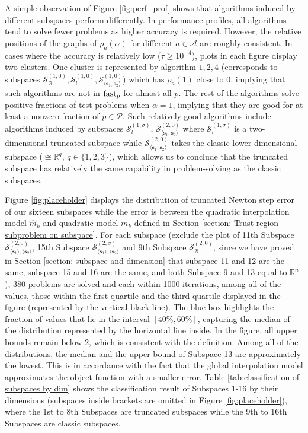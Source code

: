 \documentclass[colorlinks=true, linkcolor=blue, citecolor=blue, urlcolor=blue]{article}
\theoremstyle{plain}
\theoremstyle{definition}
\theoremstyle{remark}
\newcommand{\RR}{\mathbb{R}}
\begin{document}
A simple observation of Figure \ref{fig:perf_prof} shows that algorithms induced by different subspaces perform differently. In performance profiles, all algorithms tend to solve fewer problems as higher accuracy is required. However, the relative positions of the graphs of $\rho_a(\alpha)$ for different $a\in\mathcal{A}$ are roughly consistent. 
In cases where the accuracy is relatively low ($\tau\geq 10^{-4}$), plots in each figure display two clusters. One cluster is represented by algorithm $1,2,4$
(corresponds to subspaces $\mathcal{S}_{\mathcal{B}}^{(1,0)},\mathcal{S}_{l}^{(1,0)}, \mathcal{S}_{\langle\bm s_1,\bm s_2\rangle}^{(1,0)}$) which has $\rho_a(1)$ close to $0$, implying that such algorithms are not in ${\rm fast}_p$ for almost all $p$. The rest of the algorithms solve positive fractions of test problems when $\alpha=1$, implying that they are good for at least a nonzero fraction of $p\in\mathcal{P}$. Such relatively good algorithms include algorithms induced by subspaces $\mathcal{S}_{l}^{(1,\sigma)}$, $\mathcal{S}_{\langle\bm s_1,\bm s_2\rangle}^{(2,0)}$ where $\mathcal{S}_{l}^{(1,\sigma)}$ is a two-dimensional truncated subspace while $\mathcal{S}_{\langle\bm s_1,\bm s_2\rangle}^{(2,0)}$ takes the classic lower-dimensional subspace ($\cong \mathbb{R}^q$, $q\in\{1,2,3\}$), which allows us to conclude that the truncated subspace has relatively the same capability in problem-solving as the classic subspaces.

Figure \ref{fig:placeholder} displays the distribution of truncated Newton step error of our sixteen subspaces while the error is between the quadratic interpolation model $\hat{m}_k$ and quadratic model $m_k$ defined in Section \ref{section: Trust region subproblem on subspace}. For each subspace (exclude the plot of 11th Subspace $\mathcal{S}_{\langle\bm s_1\rangle,\langle\bm s_2\rangle}^{(2,0)}$, 15th Subspace $\mathcal{S}_{\langle\bm s_1\rangle,\langle\bm s_2\rangle}^{(2,\sigma)}$ and 9th Subspace $\mathcal{S}_{\mathcal{B}}^{(2,0)}$, since we have proved in Section \ref{section: subspace and dimension} that subspace 11 and 12 are the same, subspace 15 and 16 are the same, and both Subspace 9 and 13 equal to $\RR^n$), 380 problems are solved and each within 1000 iterations, among all of the values, those within the first quartile and the third quartile displayed in the figure (represented by the vertical black line). The blue box highlights the fraction of values that lie in the interval $[40\%,60\%]$, capturing the median of the distribution represented by the horizontal line inside. In the figure, all upper bounds 
remain below $2$, which is consistent with the definition. Among all of the distributions, the median and the upper bound of Subspace 13 are approximately the lowest. This is in accordance with the fact that the global interpolation model approximates the object function with a smaller error. Table \ref{tab:classification of subspaces by dim} shows the classification result of Subspaces 1-16 by their dimensions (subspaces inside brackets are omitted in Figure \ref{fig:placeholder}), where the 1st to 8th Subspaces are truncated subspaces while the 9th to 16th Subspaces are classic subspaces.
\end{document}

